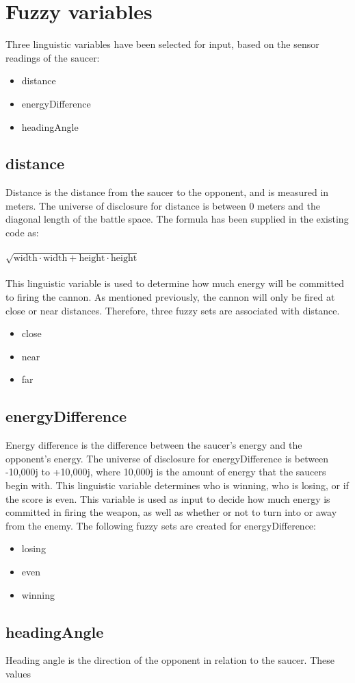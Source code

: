 \newpage

\section{Fuzzy variables}

Three linguistic variables have been selected for input, based on the sensor readings of the saucer:

\begin{itemize}
	\item distance
	\item energyDifference
	\item headingAngle
\end{itemize}

\subsection{distance}

Distance is the distance from the saucer to the opponent, and is measured in meters. The universe of disclosure for distance is between 0 meters and the diagonal length of the battle space. The formula has been supplied in the existing code as:
\\
\\
$\sqrt{\mbox{width} \cdot \mbox{width} + \mbox{height} \cdot \mbox{height}}$
\\
\\
This linguistic variable is used to determine how much energy will be committed to firing the cannon. As mentioned previously, the cannon will only be fired at close or near distances. Therefore, three fuzzy sets are associated with distance.

\begin{itemize}
	\item close
	\item near
	\item far
\end{itemize}

\subsection{energyDifference}

Energy difference is the difference between the saucer's energy and the opponent's energy. The universe of disclosure for energyDifference is between -10,000j to +10,000j, where 10,000j is the amount of energy that the saucers begin with. This linguistic variable determines who is winning, who is losing, or if the score is even. This variable is used as input to decide how much energy is committed in firing the weapon, as well as whether or not to turn into or away from the enemy. The following fuzzy sets are created for energyDifference:

\begin{itemize}
	\item losing
	\item even
	\item winning
\end{itemize}

\subsection{headingAngle}

Heading angle is the direction of the opponent in relation to the saucer. These values